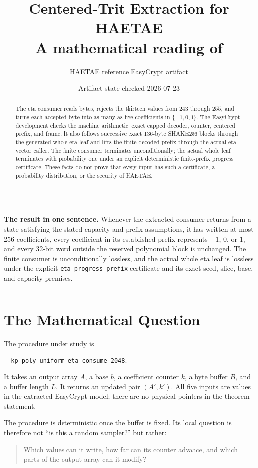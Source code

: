 \documentclass[11pt]{article}
\title{Centered-Trit Extraction for HAETAE\\
\large A mathematical reading of \code{TargetKeygenEtaSampler.ec}}
\author{HAETAE reference EasyCrypt artifact}
\date{Artifact state checked 2026-07-23}
\theoremstyle{definition}
\theoremstyle{plain}
\theoremstyle{remark}
\newcommand{\code}[1]{\nolinkurl{#1}}
\newenvironment{resultbox}
  {\begin{center}\begin{minipage}{0.94\linewidth}\color{artifactgreen}\hrule\vspace{0.6em}\color{black}}
  {\vspace{0.6em}\color{artifactgreen}\hrule\end{minipage}\end{center}}
\begin{document}
\maketitle

\begin{abstract}
The eta consumer reads bytes, rejects the thirteen values from $243$ through
$255$, and turns each accepted byte into as many as five coefficients in
$\{-1,0,1\}$.  The EasyCrypt development checks the machine arithmetic,
exact capped decoder, counter, centered prefix, and frame.  It also follows
successive exact 136-byte SHAKE256 blocks through the generated whole eta leaf
and lifts the finite decoded prefix through the actual eta vector caller.  The
finite consumer terminates unconditionally; the actual whole leaf terminates
with probability one under an explicit deterministic finite-prefix progress
certificate.  These facts do not prove that every input has such a certificate,
a probability distribution, or the security of HAETAE.
\end{abstract}

\begin{resultbox}
\textbf{The result in one sentence.}
Whenever the extracted consumer returns from a state satisfying the stated
capacity and prefix assumptions, it has written at most 256 coefficients,
every coefficient in its established prefix represents $-1$, $0$, or $1$,
and every 32-bit word outside the reserved polynomial block is unchanged.  The
finite consumer is unconditionally lossless, and the actual whole eta leaf is
lossless under the explicit \code{eta_progress_prefix} certificate and its
exact seed, slice, base, and capacity premises.
\end{resultbox}

\section{The Mathematical Question}

The procedure under study is
\begin{center}
\code{__kp_poly_uniform_eta_consume_2048}.
\end{center}
It takes an output array $A$, a base $b$, a coefficient counter $k$, a byte
buffer $B$, and a buffer length $L$.  It returns an updated pair $(A',k')$.
All five inputs are values in the extracted EasyCrypt model; there are no
physical pointers in the theorem statement.

The procedure is deterministic once the buffer is fixed.  Its local question
is therefore not ``is this a random sampler?'' but rather:
\begin{quote}
Which values can it write, how far can its counter advance, and which parts of
the output array can it modify?
\end{quote}
\end{document}
